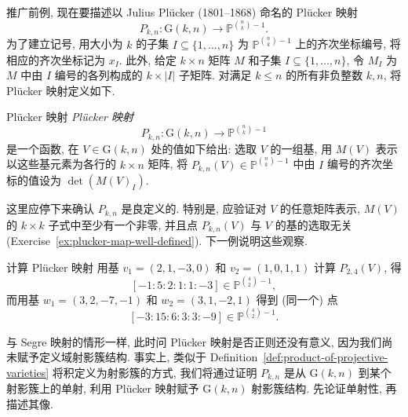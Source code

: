 推广前例, 现在要描述以 Julius Plücker (1801--1868) 命名的 Plücker 映射
\[
  P_{k,n}:\mathrm{G}(k,n)\to\mathbb{P}^{\binom{n}{k}-1}.
\]
为了建立记号, 用大小为 $k$ 的子集 $I\subseteq\{1,\ldots,n\}$ 为 $\mathbb{P}^{\binom{n}{k}-1}$ 上的齐次坐标编号, 将相应的齐次坐标记为 $x_{I}$. 此外, 给定 $k\times n$ 矩阵 $M$ 和子集 $I\subseteq\{1,\ldots,n\}$, 令 $M_{I}$ 为 $M$ 中由 $I$ 编号的各列构成的 $k\times|I|$ 子矩阵. 对满足 $k\le n$ 的所有非负整数 $k,n$, 将 Plücker 映射定义如下.

\begin{Definition}{Plücker 映射}\leavevmode\label{def:plucker-maps}
\emph{Plücker 映射}
\[
  P_{k,n}:\mathrm{G}(k,n)\to\mathbb{P}^{\binom{n}{k}-1}
\]
是一个函数, 在 $V\in\mathrm{G}(k,n)$ 处的值如下给出: 选取 $V$ 的一组基, 用 $M(V)$ 表示以这些基元素为各行的 $k\times n$ 矩阵, 将 $P_{k,n}(V)\in\mathbb{P}^{\binom{n}{k}-1}$ 中由 $I$ 编号的齐次坐标的值设为 $\det(M(V)_{I})$.
\end{Definition}

这里应停下来确认 $P_{k,n}$ 是良定义的. 特别是, 应验证对 $V$ 的任意矩阵表示, $M(V)$ 的 $k\times k$ 子式中至少有一个非零, 并且点 $P_{k,n}(V)$ 与 $V$ 的基的选取无关 (Exercise~\ref{ex:plucker-map-well-defined}). 下一例说明这些观察.

\begin{Example}{计算 Plücker 映射}\leavevmode\label{ex:compute-plucker-map-for-plane-in-four-space}
用基 $v_{1}=(2,1,-3,0)$ 和 $v_{2}=(1,0,1,1)$ 计算 $P_{2,4}(V)$, 得
\[
  [-1:5:2:1:1:-3]\in\mathbb{P}^{\binom{4}{2}-1},
\]
而用基 $w_{1}=(3,2,-7,-1)$ 和 $w_{2}=(3,1,-2,1)$ 得到 (同一个) 点
\[
  [-3:15:6:3:3:-9]\in\mathbb{P}^{\binom{4}{2}-1}.
\]
\end{Example}

与 Segre 映射的情形一样, 此时问 Plücker 映射是否正则还没有意义, 因为我们尚未赋予定义域射影簇结构. 事实上, 类似于 Definition~\ref{def:product-of-projective-varieties} 将积定义为射影簇的方式, 我们将通过证明 $P_{k,n}$ 是从 $\mathrm{G}(k,n)$ 到某个射影簇上的单射, 利用 Plücker 映射赋予 $\mathrm{G}(k,n)$ 射影簇结构. 先论证单射性, 再描述其像.

